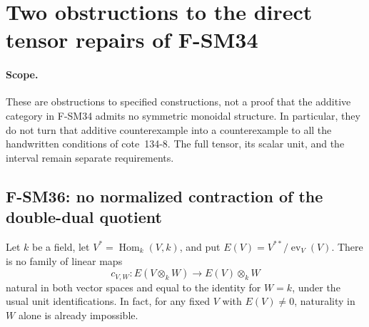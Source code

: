 \section{Two obstructions to the direct tensor repairs of F-SM34}

\paragraph{Scope.}
These are obstructions to specified constructions, not a proof that
the additive category in F-SM34 admits no symmetric monoidal
structure.  In particular, they do not turn that additive
counterexample into a counterexample to all the handwritten
conditions of cote~134-8.  The full tensor, its scalar unit, and the
interval remain separate requirements.

\subsection{F-SM36: no normalized contraction of the double-dual quotient}

Let \(k\) be a field, let \(V^*=\operatorname{Hom}_k(V,k)\), and
put \(E(V)=V^{**}/\operatorname{ev}_V(V)\).  There is no family of
linear maps
\[
 c_{V,W}:E(V\otimes_k W)\longrightarrow E(V)\otimes_k W
                                                               \tag{SM36.1}
\]
natural in both vector spaces and equal to the identity for
\(W=k\), under the usual unit identifications.  In fact, for any
fixed \(V\) with \(E(V)\ne0\), naturality in \(W\) alone is
already impossible.

